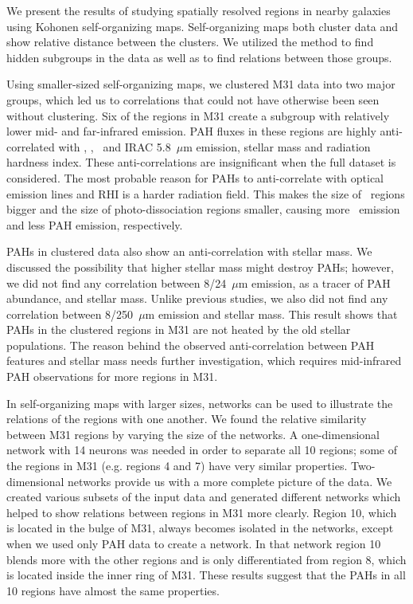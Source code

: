 We present the results of studying spatially resolved regions in nearby galaxies using Kohonen self-organizing maps.
Self-organizing maps both cluster data and show relative distance between the clusters. 
We utilized the method to find hidden subgroups in the data as well as to find relations between those groups.

Using smaller-sized self-organizing maps, we clustered M31 data into two major groups, which led us to correlations that could not have otherwise been seen without clustering.
Six of the regions in M31 create a subgroup with relatively lower mid- and far-infrared emission.
PAH fluxes in these regions are highly anti-correlated with \halpha, \sii, \oiii~and IRAC 5.8~$\mu$m emission, stellar mass and radiation hardness index.
These anti-correlations are insignificant when the full dataset is considered.
The most probable reason for PAHs to anti-correlate with optical emission lines and RHI is a harder radiation field.
This makes the size of \hii~regions bigger and the size of photo-dissociation regions smaller, causing more \halpha~emission and less PAH emission, respectively.

PAHs in clustered data also show an anti-correlation with stellar mass.
We discussed the possibility that higher stellar mass might destroy PAHs;
however, we did not find any correlation between 8/24~$\mu$m emission, as a tracer of PAH abundance, and stellar mass.
Unlike previous studies, we also did not find any correlation between 8/250~$\mu$m emission and stellar mass. 
This result shows that PAHs in the clustered regions in M31 are not heated by the old stellar populations.
The reason behind the observed anti-correlation between PAH features and stellar mass needs further investigation, which requires mid-infrared PAH observations for more regions in M31. 

In self-organizing maps with larger sizes, networks can be used to illustrate the relations of the regions with one another.
We found the relative similarity between M31 regions by varying the size of the networks.
A one-dimensional network with 14 neurons was needed in order to
separate all 10 regions; some of the regions in M31 (e.g. regions 4 and 7) have very similar properties.
Two-dimensional networks provide us with a more complete picture of the data.
We created various subsets of the input data and generated different networks which helped to show relations between regions in M31 more clearly.
Region 10, which is located in the bulge of M31, always becomes isolated in the networks, except when we  used only PAH data to create a network.
In that network region 10 blends more with the other regions and is only differentiated from region 8, which is located inside the inner ring of M31.
These results suggest that the PAHs in all 10 regions have almost the same properties.

